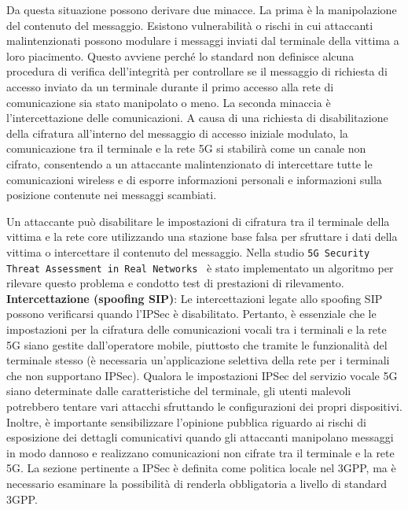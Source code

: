 \documentclass[english]{article}
\begin{document}
Da questa situazione possono derivare due minacce. La prima è la manipolazione
del contenuto del messaggio. Esistono vulnerabilità o rischi in cui attaccanti
malintenzionati possono modulare i messaggi inviati dal terminale della vittima
a loro piacimento. Questo avviene perché lo standard non definisce alcuna
procedura di verifica dell'integrità per controllare se il messaggio di
richiesta di accesso inviato da un terminale durante il primo accesso alla rete
di comunicazione sia stato manipolato o meno. La seconda minaccia è
l'intercettazione delle comunicazioni. A causa di una richiesta di
disabilitazione della cifratura all'interno del messaggio di accesso iniziale
modulato, la comunicazione tra il terminale e la rete 5G si stabilirà come un
canale non cifrato, consentendo a un attaccante malintenzionato di intercettare
tutte le comunicazioni wireless e di esporre informazioni personali e
informazioni sulla posizione contenute nei messaggi scambiati.

Un attaccante può disabilitare le impostazioni di cifratura tra il terminale
della vittima e la rete core utilizzando una stazione base falsa per sfruttare
i dati della vittima o intercettare il contenuto del messaggio. Nella studio
\texttt{5G Security Threat Assessment in Real Networks}~\cite{Park20215G} è
stato implementato un algoritmo per rilevare questo problema e condotto test di
prestazioni di rilevamento. \\[0.2cm]
\textbf{Intercettazione (spoofing SIP)}: Le intercettazioni legate allo spoofing SIP
possono verificarsi quando l'IPSec è disabilitato. Pertanto, è essenziale che le 
impostazioni per la cifratura delle comunicazioni vocali tra i terminali e la rete 
5G siano gestite dall'operatore mobile, piuttosto che tramite le funzionalità del 
terminale stesso (è necessaria un'applicazione selettiva della rete per i terminali 
che non supportano IPSec). Qualora le impostazioni IPSec del servizio vocale 5G siano 
determinate dalle caratteristiche del terminale, gli utenti malevoli potrebbero tentare 
vari attacchi sfruttando le configurazioni dei propri dispositivi. Inoltre, 
è importante sensibilizzare l'opinione pubblica riguardo ai rischi di esposizione 
dei dettagli comunicativi quando gli attaccanti manipolano messaggi in modo dannoso e 
realizzano comunicazioni non cifrate tra il terminale e la rete 5G. La sezione pertinente 
a IPSec è definita come politica locale nel 3GPP, ma è necessario esaminare la possibilità 
di renderla obbligatoria a livello di standard 3GPP.
\end{document}
